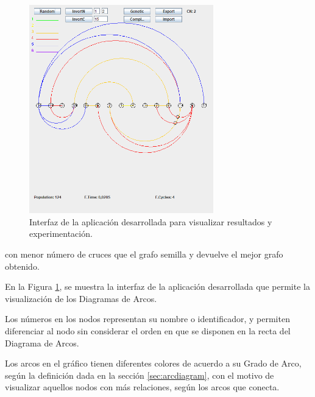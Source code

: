 	\begin{figure}
		\centering
		\includegraphics[width=8cm]{imagenes/aplicacion.png}
		\caption{Interfaz de la aplicación desarrollada para visualizar resultados y experimentación.}
		\label{fig:aplicacion}
	\end{figure}

	
	
	
	
\noindent con menor número de cruces que el grafo semilla y devuelve el mejor grafo obtenido.
	
		En la  Figura \ref{fig:aplicacion}, se muestra la interfaz  de la aplicación desarrollada  que permite la visualización de los Diagramas de Arcos.
		
			Los números en los nodos representan su nombre o identificador,  y permiten diferenciar al nodo sin considerar el 
	 orden en que se disponen en la recta del Diagrama de Arcos.
	
	Los arcos en el gráfico tienen diferentes colores de acuerdo a su Grado de Arco, según la definición dada en la sección \ref{sec:arcdiagram}, con el motivo de visualizar aquellos nodos con más relaciones, según los arcos que conecta.
	
